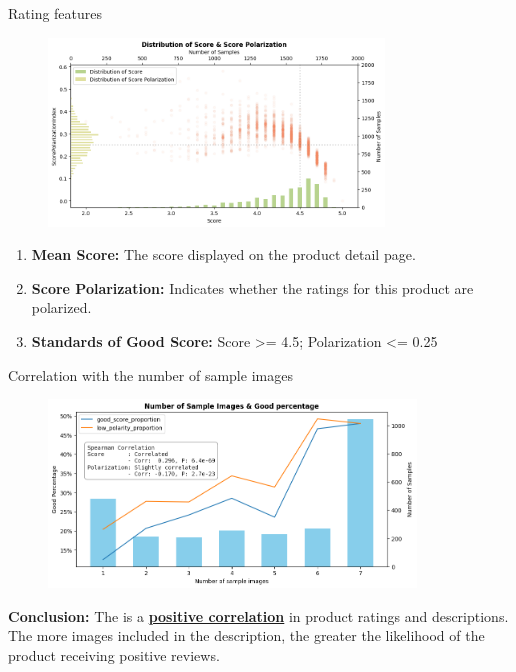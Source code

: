 \begin{frame}{Rating features}

	\begin{figure}
		\centering
			\includegraphics[height=5cm]{pic/score-scatter.png}
	\end{figure}

    \begin{enumerate}
        \item \textbf{Mean Score:} The score displayed on the product detail page.
        \item \textbf{Score Polarization:} Indicates whether the ratings for this product are polarized.
        \item \textbf{Standards of Good Score:} Score >= 4.5; Polarization <= 0.25
    \end{enumerate}

\end{frame}
	
\begin{frame}{Correlation with the number of sample images}

	\begin{figure}
		\centering
			\includegraphics[height=5cm]{pic/corr_n_image.png}
	\end{figure}

    \textbf{Conclusion:} The is a \underline{\textbf{positive correlation}} in product ratings and descriptions. The more images included in the description, the greater the likelihood of the product receiving positive reviews.

\end{frame}


